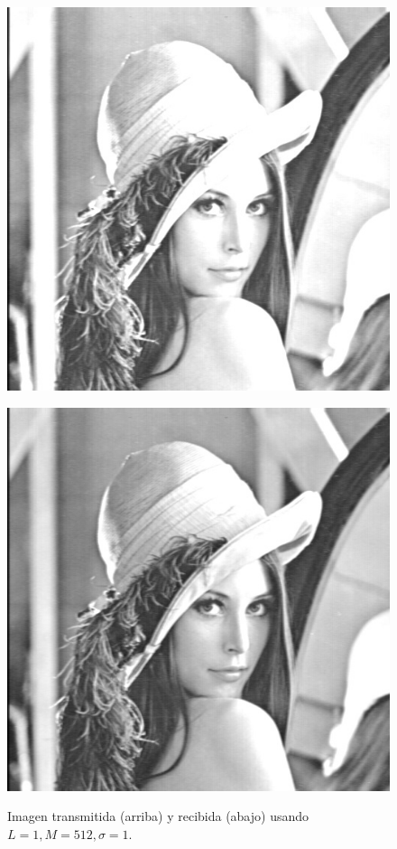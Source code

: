 \documentclass[10pt,journal,compsoc]{IEEEtran}
\begin{document}
\begin{figure}
\begin{center}
\label{fig:refuerzos2}
\centering
\begin{minipage}{.5\textwidth}
  \centering

  \includegraphics[scale=0.25]{../Linterno5/512/1/imgTrans.jpg}
\end{minipage}
\vspace{0cm}
\begin{minipage}{.5\textwidth}
  \centering
  \includegraphics[scale=0.25]{../Linterno5/512/1/imgRec.jpg}
  \label{fig:sub2}
\end{minipage}
\caption{Imagen transmitida (arriba) y recibida (abajo) usando $L=1 , M=512, \sigma=1$.}
\label{fig:test}
\end{center}
\end{figure}
\end{document}
